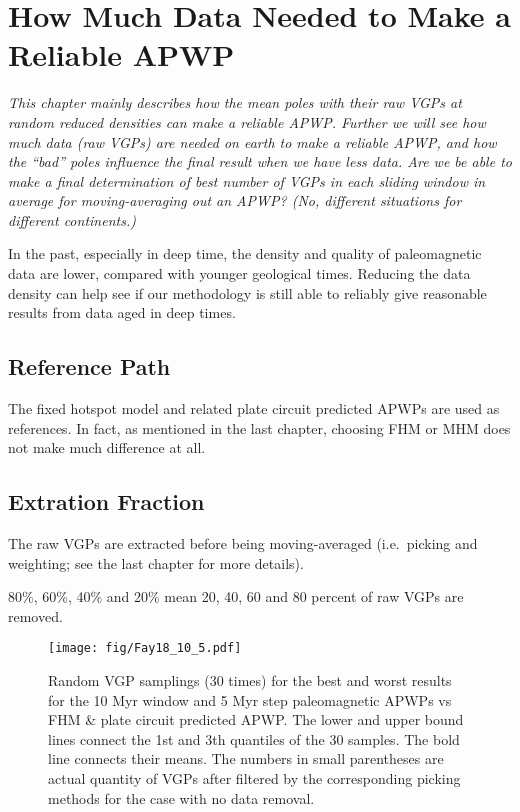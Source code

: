 \chapter{How Much Data Needed to Make a Reliable APWP}\label{chap:DatNeed}
\textit{This chapter mainly describes how the mean poles with their raw VGPs
at random reduced densities can make a reliable APWP\@. Further we will see how
much data (raw VGPs) are needed on earth to make a reliable APWP, and how the
``bad'' poles influence the final result when we have less data. Are we be able
to make a final determination of best number of VGPs in each sliding window in
average for moving-averaging out an APWP? (No, different situations for
different continents.)}
\vfill
\minitoc\newpage

In the past, especially in deep time, the density and quality of paleomagnetic
data are lower, compared with younger geological times. Reducing the data
density can help see if our methodology is still able to reliably give
reasonable results from data aged in deep times.

\section{Reference Path}

The fixed hotspot model and related plate circuit predicted APWPs are used as
references. In fact, as mentioned in the last chapter, choosing FHM or MHM does
not make much difference at all.

\section{Extration Fraction}

The raw VGPs are extracted before being moving-averaged (i.e.\ picking and
weighting; see the last chapter for more details).

80\%, 60\%, 40\% and 20\% mean 20, 40, 60 and 80 percent of raw VGPs are
removed.

\begin{figure}
    \centering
        \texttt{[image: fig/Fay18\_10\_5.pdf]}
    \captionsetup{width=.95\textwidth}
    \caption{Random VGP samplings (30 times) for the best and worst results for
	the 10 Myr window and 5 Myr step paleomagnetic APWPs vs FHM \& plate circuit
	predicted APWP\@. The lower and upper bound lines connect the 1st and 3th
	quantiles of the 30 samples. The bold line connects their means. The
	numbers in small parentheses are actual quantity of VGPs after filtered by
	the corresponding picking methods for the case with no data
	removal.}\label{Fig:Fay18_10_5bw}
\end{figure}

